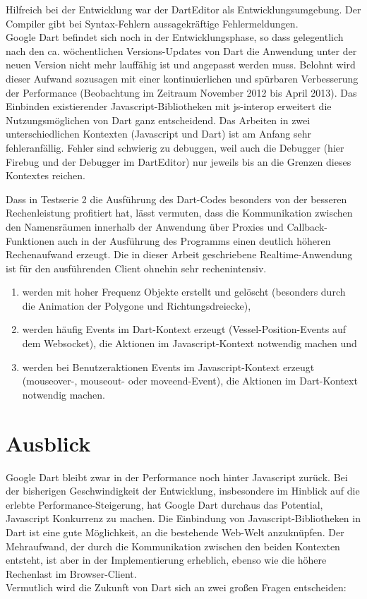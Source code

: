 Hilfreich bei der Entwicklung war der DartEditor als Entwicklungsumgebung. Der Compiler gibt bei Syntax-Fehlern aussagekräftige Fehlermeldungen.\\  
Google Dart befindet sich noch in der Entwicklungsphase, so dass gelegentlich nach den ca. wöchentlichen Versions-Updates von Dart die Anwendung unter der neuen Version nicht mehr lauffähig ist und angepasst werden muss. Belohnt wird dieser Aufwand sozusagen mit einer kontinuierlichen und spürbaren Verbesserung der Performance (Beobachtung im Zeitraum November 2012 bis April 2013).
Das Einbinden existierender Javascript-Bibliotheken mit js-interop erweitert die Nutzungsmöglichen von Dart ganz entscheidend. Das Arbeiten in zwei unterschiedlichen Kontexten (Javascript und Dart) ist am Anfang sehr fehleranfällig. Fehler sind schwierig zu debuggen, weil auch die Debugger (hier Firebug und der Debugger im DartEditor) nur jeweils bis an die Grenzen dieses Kontextes reichen.

Dass in Testserie 2 die Ausführung des Dart-Codes besonders von der besseren Rechenleistung profitiert hat, lässt vermuten, dass die Kommunikation zwischen den Namensräumen innerhalb der Anwendung über Proxies und Callback-Funktionen auch in der Ausführung des Programms einen deutlich höheren Rechenaufwand erzeugt.
Die in dieser Arbeit geschriebene Realtime-Anwendung ist für den ausführenden Client ohnehin sehr rechenintensiv.
\begin{enumerate}
\item werden mit hoher Frequenz Objekte erstellt und gelöscht (besonders durch die Animation der Polygone und Richtungsdreiecke), 
\item werden häufig Events im Dart-Kontext erzeugt (Vessel-Position-Events auf dem Websocket), die Aktionen im Javascript-Kontext notwendig machen und
\item werden bei Benutzeraktionen Events im Javascript-Kontext erzeugt (mouseover-, mouseout- oder moveend-Event), die Aktionen im Dart-Kontext notwendig machen.
\end{enumerate}

\section{Ausblick}

Google Dart bleibt zwar in der Performance noch hinter Javascript zurück. Bei der bisherigen Geschwindigkeit der Entwicklung, insbesondere im Hinblick auf die erlebte Performance-Steigerung, hat Google Dart durchaus das Potential, Javascript Konkurrenz zu machen.
Die Einbindung von Javascript-Bibliotheken in Dart ist eine gute Möglichkeit, an die bestehende Web-Welt anzuknüpfen. Der Mehraufwand, der durch die Kommunikation zwischen den beiden Kontexten entsteht, ist aber in der Implementierung erheblich, ebenso wie die höhere Rechenlast im Browser-Client.\\
Vermutlich wird die Zukunft von Dart sich an zwei großen Fragen entscheiden:

